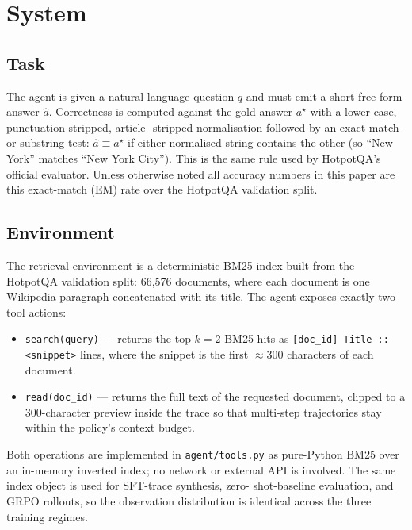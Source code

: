\documentclass[11pt]{article}
\begin{document}
\section{System}
\label{sec:system}

\subsection{Task}
\label{sec:task}
The agent is given a natural-language question $q$ and must emit a
short free-form answer $\hat a$. Correctness is computed against the
gold answer $a^\star$ with a lower-case, punctuation-stripped, article-
stripped normalisation followed by an exact-match-or-substring test:
$\hat a \equiv a^\star$ if either normalised string contains the other
(so ``New York'' matches ``New York City''). This is the same rule used
by HotpotQA's official evaluator. Unless otherwise noted all accuracy
numbers in this paper are this exact-match (EM) rate over the HotpotQA
validation split.

\subsection{Environment}
\label{sec:env}
The retrieval environment is a deterministic BM25 index built from the
HotpotQA validation split: 66{,}576 documents, where each document is
one Wikipedia paragraph concatenated with its title. The agent exposes
exactly two tool actions:

\begin{itemize}
  \item \texttt{search(query)} --- returns the top-$k{=}2$ BM25 hits as
  \texttt{[doc\_id] Title :: <snippet>} lines, where the snippet is the
  first $\approx$300 characters of each document.
  \item \texttt{read(doc\_id)} --- returns the full text of the requested
  document, clipped to a 300-character preview inside the trace so that
  multi-step trajectories stay within the policy's context budget.
\end{itemize}

Both operations are implemented in \texttt{agent/tools.py} as pure-Python
BM25 over an in-memory inverted index; no network or external API is
involved. The same index object is used for SFT-trace synthesis, zero-
shot-baseline evaluation, and GRPO rollouts, so the observation
distribution is identical across the three training regimes.
\end{document}

